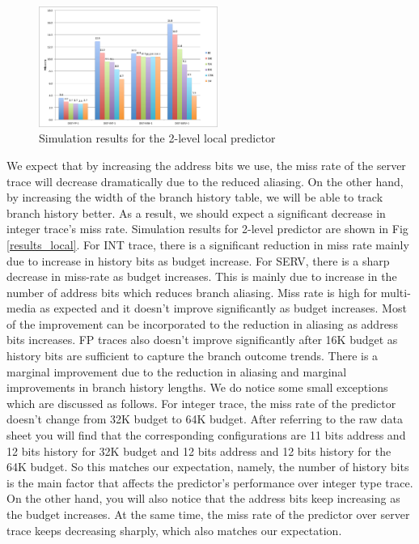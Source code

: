 \documentclass[conference]{IEEEtran}
\begin{document}
\begin{figure}[!t]
\centering
\includegraphics[width=2.3in]{2-level}
\caption{Simulation results for the 2-level local predictor}
\label{fig1}
\end{figure}
We expect that by increasing the address bits we use, the miss rate of the server trace will decrease dramatically due to the reduced aliasing. On the other hand, by increasing the width of the branch history table, we will be able to track branch history better. As a result, we should expect a significant decrease in integer trace's miss rate.  Simulation results for 2-level predictor are shown in Fig \ref{results_local}. 
For INT trace, there is a significant reduction in miss rate mainly due to increase in history bits as budget increase. For SERV, there is a sharp decrease in miss-rate as budget increases. This is mainly due to increase in the number of address bits which reduces branch aliasing. Miss rate is high for multi-media as expected and it doesn't improve significantly as budget increases. Most of the improvement can be incorporated to the reduction in aliasing as address bits increases. FP traces also doesn't improve significantly after 16K budget as history bits are sufficient to capture the branch outcome trends. There is a marginal improvement due to the reduction in aliasing and marginal improvements in branch history lengths. We do notice some small exceptions which are discussed as follows. For integer trace, the miss rate of the predictor doesn't change from 32K budget to 64K budget. After referring to the raw data sheet you will find that the corresponding configurations are 11 bits address and 12 bits history for 32K budget and 12 bits address and 12 bits history for the 64K budget. So this matches our expectation, namely, the number of history bits is the main factor that affects the predictor's performance over integer type trace. On the other hand, you will also notice that the address bits keep increasing as the budget increases. At the same time, the miss rate of the predictor over server trace keeps decreasing sharply, which also matches our expectation.
\end{document}
